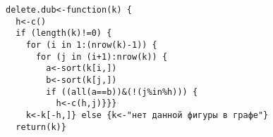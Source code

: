\documentclass[12pt, a4paper]{article}
\begin{document}
\begin{verbatim}
delete.dub<-function(k) {
  h<-c()
  if (length(k)!=0) {
    for (i in 1:(nrow(k)-1)) {
      for (j in (i+1):nrow(k)) {
        a<-sort(k[i,])
        b<-sort(k[j,])
        if ((all(a==b))&(!(j%in%h))) {
          h<-c(h,j)}}} 
    k<-k[-h,]} else {k<-"нет данной фигуры в графе"}
  return(k)}
  \end{verbatim}
\end{document}
